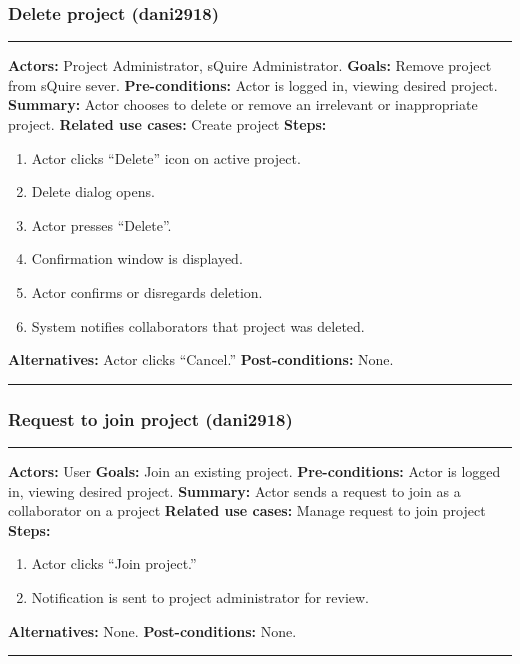 \documentclass[11pt]{report}
\begin{document}
\subsubsection{Delete project (dani2918)}
\vspace{2pt}
\hrule
\vspace{8pt}
 \textbf{Actors:} Project Administrator, sQuire Administrator. \newline
\textbf{Goals:} Remove project from sQuire sever. \newline
 \textbf{Pre-conditions:} Actor is logged in, viewing desired project.  \newline
\textbf{Summary:} Actor chooses to delete or remove an irrelevant or inappropriate project.  \newline
\textbf{Related use cases:} Create project\newline
\textbf{Steps:} \begin{enumerate}
  \item Actor clicks ``Delete'' icon on active project.
  \item Delete dialog opens.
  \item Actor presses ``Delete''.
  \item Confirmation window is displayed.
  \item Actor confirms or disregards deletion.
  \item System notifies collaborators that project was deleted.
 \end{enumerate}
 \textbf{Alternatives:} Actor clicks ``Cancel.'' \newline
 \textbf{Post-conditions:} None. \newline
\vspace{8pt}
\hrule
\newpage

\subsubsection{Request to join project (dani2918)}
\vspace{2pt}
\hrule
\vspace{8pt}
 \textbf{Actors:} User \newline
\textbf{Goals:} Join an existing project. \newline
 \textbf{Pre-conditions:} Actor is logged in, viewing desired project.  \newline
\textbf{Summary:} Actor sends a request to join as a collaborator on a project\newline
\textbf{Related use cases:} Manage request to join project\newline
\textbf{Steps:} \begin{enumerate}
  \item Actor clicks ``Join project.''
  \item Notification is sent to project administrator for review.
 \end{enumerate}
 \textbf{Alternatives:} None. \newline
 \textbf{Post-conditions:} None. \newline
\vspace{8pt}
\hrule
\newpage
\end{document}
